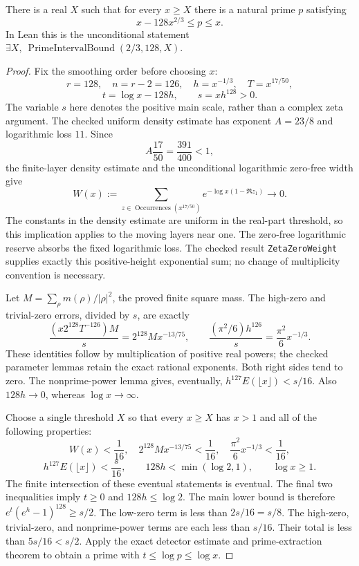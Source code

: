 \begin{theorem}
\label{kernel:prime-interval}
\leanok
There is a real $X$ such that for every $x\geq X$ there is a natural
prime $p$ satisfying
\[
 x-128x^{2/3}\leq p\leq x.
\]
In Lean this is the unconditional statement
$\exists X,\ \operatorname{PrimeIntervalBound}(2/3,128,X)$.
\end{theorem}
\begin{proof}
Fix the smoothing order before choosing $x$:
\[
 r=128,\quad n=r-2=126,\quad h=x^{-1/3},\quad T=x^{17/50},
\]
\[
 t=\log x-128h,\qquad s=xh^{128}>0.
\]
The variable $s$ here denotes the positive main scale, rather than a
complex zeta argument.  The checked uniform density estimate has
exponent $A=23/8$ and logarithmic loss $11$.
Since
\[
 A\frac{17}{50}=\frac{391}{400}<1,
\]
the finite-layer density estimate and the unconditional logarithmic
zero-free width give
\[
 W(x):=\sum_{z\in\operatorname{Occurrences}(x^{17/50})}
       e^{-\log x(1-\Re z_1)}\longrightarrow0.
\]
The constants in the density estimate are uniform in the real-part
threshold, so this implication applies to the moving layers near one.
The zero-free logarithmic reserve absorbs the fixed logarithmic loss.
The checked result \texttt{ZetaZeroWeight} supplies exactly this
positive-height exponential sum; no change of multiplicity convention
is necessary.

Let $M=\sum_\rho m(\rho)/|\rho|^2$, the proved finite square mass.
The high-zero and trivial-zero errors, divided by $s$, are exactly
\[
 \frac{(x2^{128}T^{-126})M}{s}
       =2^{128}M x^{-13/75},\qquad
 \frac{(\pi^2/6)h^{126}}{s}
       =\frac{\pi^2}{6}x^{-1/3}.
\]
These identities follow by multiplication of positive real powers;
the checked parameter lemmas retain the exact rational exponents.
Both right sides tend to zero.
The nonprime-power lemma gives, eventually,
$h^{127}E(\lfloor x\rfloor)<s/16$.
Also $128h\to0$, whereas $\log x\to\infty$.

Choose a single threshold $X$ so that every $x\geq X$ has $x>1$ and
all of the following properties:
\[
 W(x)<\frac1{16},\quad
 2^{128}M x^{-13/75}<\frac1{16},\quad
 \frac{\pi^2}{6}x^{-1/3}<\frac1{16},
\]
\[
 h^{127}E(\lfloor x\rfloor)<\frac{s}{16},\qquad
 128h<\min(\log2,1),\qquad \log x\geq1.
\]
The finite intersection of these eventual statements is eventual.
The final two inequalities imply $t\geq0$ and $128h\leq\log2$.
The main lower bound is therefore
$e^t(e^h-1)^{128}\geq s/2$.
The low-zero term is less than $2s/16=s/8$.
The high-zero, trivial-zero, and nonprime-power terms are each less
than $s/16$.  Their total is less than $5s/16<s/2$.
Apply the exact detector estimate and prime-extraction theorem to
obtain a prime with $t\leq\log p\leq\log x$.


\end{proof}
